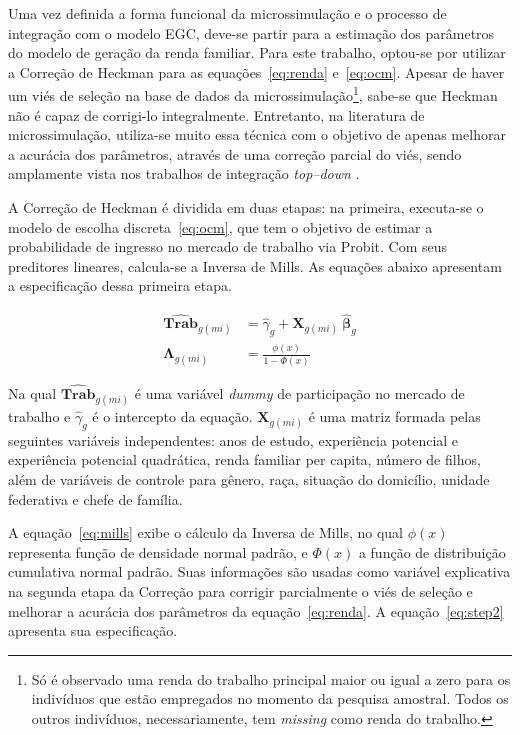 Uma vez definida a forma funcional da microssimulação e o processo de integração com o modelo EGC, deve-se partir para a estimação dos parâmetros do modelo de geração da renda familiar. Para este trabalho, optou-se por utilizar a Correção de Heckman para as equações~\eqref{eq:renda} e~\eqref{eq:ocm}. Apesar de haver um viés de seleção na base de dados da microssimulação\footnote{Só é observado uma renda do trabalho principal maior ou igual a zero para os indivíduos que estão empregados no momento da pesquisa amostral. Todos os outros indivíduos, necessariamente, tem \textit{missing} como renda do trabalho.}, sabe-se que Heckman não é capaz de corrigi-lo integralmente. Entretanto, na literatura de microssimulação, utiliza-se muito essa técnica com o objetivo de apenas melhorar a acurácia dos parâmetros, através de uma correção parcial do viés, sendo amplamente vista nos trabalhos de integração \textit{top--down} \cite{bourguignon05, colombo08, cury16}.

A Correção de Heckman \cite{heckman79} é dividida em duas etapas: na primeira, executa-se o modelo de escolha discreta~\eqref{eq:ocm}, que tem o objetivo de estimar a probabilidade de ingresso no mercado de trabalho via Probit. Com seus preditores lineares, calcula-se a Inversa de Mills. As equações abaixo apresentam a especificação dessa primeira etapa.

\begin{align}
	\boldsymbol{\hat{Trab}}_{g(mi)} &= \hat{\gamma}_g + \mathbf{X}_{g(mi)} \ \boldsymbol{\hat{\beta}}_g \label{eq:step1} \\
	\boldsymbol{\Lambda}_{g(mi)}    &= \frac{\phi(x)}{1 - \Phi(x)} \label{eq:mills}
\end{align}

Na qual $\boldsymbol{\hat{Trab}}_{g(mi)}$ é uma variável \textit{dummy} de participação no mercado de trabalho e $\hat{\gamma}_g$ é o intercepto da equação. $\mathbf{X}_{g(mi)}$ é uma matriz formada pelas seguintes variáveis independentes: anos de estudo, experiência potencial e experiência potencial quadrática, renda familiar per capita, número de filhos, além de variáveis de controle para gênero, raça, situação do domicílio, unidade federativa e chefe de família.

A equação~\eqref{eq:mills} exibe o cálculo da Inversa de Mills, no qual $\phi(x)$ representa função de densidade normal padrão, e $\Phi(x)$ a função de distribuição cumulativa normal padrão. Suas informações são usadas como variável explicativa na segunda etapa da Correção para corrigir parcialmente o viés de seleção e melhorar a acurácia dos parâmetros da equação~\eqref{eq:renda}. A equação~\eqref{eq:step2} apresenta sua especificação.

